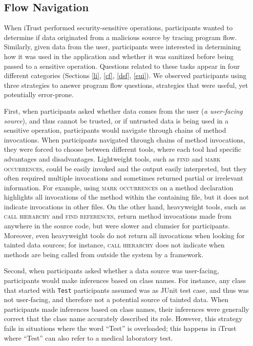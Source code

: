 \documentclass[10pt,journal,compsoc]{IEEEtran}
\begin{document}
\subsection{Flow Navigation}
\label{flowNav}
When iTrust performed security-sensitive operations, participants wanted to determine if data originated from a malicious source
by tracing program flow.
Similarly, given data from the user, participants were interested in determining how it was used in the application and whether it was sanitized before being passed to a sensitive operation. Questions related to these tasks appear in four different categories (Sections \ref{li}, \ref{cf}, \ref{dsf}, \ref{eui}).
We observed participants using three strategies to answer program flow questions,
strategies that were useful, yet potentially error-prone.

First, when participants asked whether data comes from the user (\emph{a user-facing source}), 
and thus cannot be trusted, or if untrusted data is being used in a sensitive operation,
participants would navigate through chains of method invocations.
When participants navigated through chains of method invocations,
they were forced to choose between different tools, where each tool
had specific advantages and disadvantages.
Lightweight tools, such as \textsc{find} and \textsc{mark occurrences}, could be easily invoked and the output
easily interpreted, but they often required multiple invocations and sometimes returned 
partial or irrelevant information.
For example, using \textsc{mark occurrences} on a method declaration highlights all invocations of the method 
within the containing file, but it does not indicate invocations in other files.
On the other hand, heavyweight tools, such as \textsc{call hierarchy} and \textsc{find references}, 
return method invocations made from anywhere in the source code, but were slower and clumsier for participants.
Moreover, even heavyweight tools do not return all invocations when looking for tainted data sources;
for instance, \textsc{call hierarchy} does not indicate when methods are being called from outside the system
by a framework.

Second, when participants asked whether a data source was user-facing,
participants would make inferences based on class names.
For instance, any class that started with \texttt{Test} participants assumed was as JUnit test case,
and thus was not user-facing, and therefore not a potential source of tainted data.
When participants made inferences based on class names,
their inferences were generally correct that the class name accurately described
its role.
However, this strategy
fails in situations where the word ``Test'' is overloaded;
this happens in iTrust where ``Test'' can also refer to 
a medical laboratory test.
\end{document}
